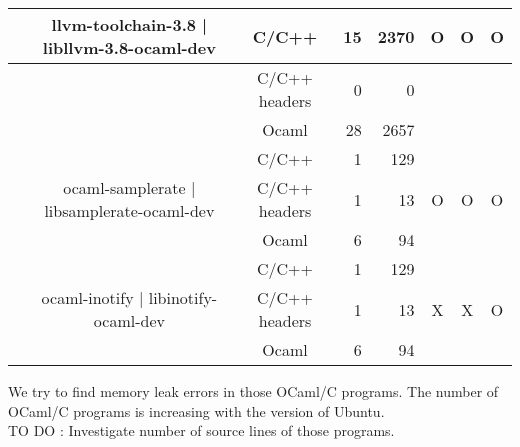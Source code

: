 \documentclass[11pt,a4paper]{article}
\begin{document}
\begin{table}[h,t]
\begin{tabular}{|>{\centering}m{3cm}| c|c|r|r| c| c|c|}
 &\multirow{3}{3cm}{llvm-toolchain-3.8 | libllvm-3.8-ocaml-dev} & C/C++ & 15 & 2370 & \multirow{3}{*}{O} & \multirow{3}{*}{O} & \multirow{3}{*}{O}\\
 \cline{3-5}
 & &                           C/C++ headers & 0 & 0 & & & \\
 \cline{3-5}
 & &                          Ocaml & 28 & 2657 & & & \\
 \cline{2-8}

 &\multirow{3}{3cm}{ocaml-samplerate | libsamplerate-ocaml-dev} & C/C++ & 1 & 129 & \multirow{3}{*}{O} & \multirow{3}{*}{O} & \multirow{3}{*}{O}\\
\cline{3-5}
& &                           C/C++ headers & 1 & 13 & & & \\
\cline{3-5}
& &                          Ocaml & 6 & 94 & & & \\
\cline{2-8}



 
 &\multirow{3}{3cm}{ocaml-inotify | libinotify-ocaml-dev } & C/C++ & 1 & 129 & \multirow{3}{*}{X} & \multirow{3}{*}{X} & \multirow{3}{*}{O}\\

\cline{3-5}
& &                           C/C++ headers & 1 & 13 & & & \\
\cline{3-5}
& &                          Ocaml & 6 & 94 & & & \\
\hline


\end{tabular}
\end{table}










We try to find memory leak errors in those OCaml/C programs. The number of OCaml/C programs is increasing with the version of Ubuntu.
\\
TO DO : Investigate number of source lines of those programs.
\\
%
%
\end{document}
